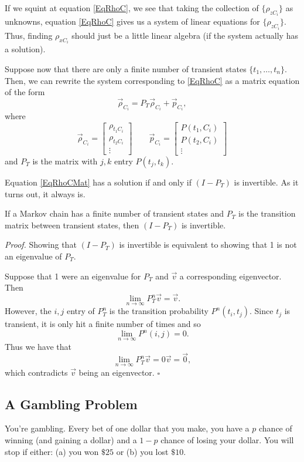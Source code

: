\documentclass{problemset}
\newcommand{\mat}[1]{\begin{bmatrix}#1\end{bmatrix}}
\renewcommand{\P}{\mathbb{P}}
\newenvironment{proof}{\emph{Proof.}}{\hfill$\square$}
\begin{document}
	If we squint at equation \eqref{EqRhoC}, we see that taking the collection of $\{\rho_{zC_i}\}$
	as unknowns, equation \eqref{EqRhoC} gives us a system of linear equations for $\{\rho_{zC_i}\}$.
	Thus, finding $\rho_{xC_i}$ should just be a little linear algebra (if the system actually has a solution).

	Suppose now that there are only a finite number of transient states $\{t_1,\ldots, t_n\}$.  Then, we can rewrite the
	system corresponding to \eqref{EqRhoC} as a matrix equation of the form
	\begin{equation}
		\label{EqRhoCMat}
		\vec \rho_{C_i} = P_T \vec \rho_{C_i} + \vec p_{C_i},
	\end{equation}
	where 
	\[
		\vec \rho_{C_i} = \mat{\rho_{t_1C_i}\\ \rho_{t_2C_i}\\\vdots}
		\qquad \vec p_{C_i} = \mat{P(t_1,C_i)\\P(t_2,C_i)\\\vdots}
	\]
	and $P_T$ is the matrix with $j,k$ entry $P(t_j,t_k)$.

	Equation \eqref{EqRhoCMat} has a solution if and only if $(I-P_T)$ is invertible.  As it turns
	out, it always is.

	\begin{theorem}
		If a Markov chain has a finite number of transient states and $P_T$ is the transition
		matrix between transient states, then $(I-P_T)$ is invertible.
	\end{theorem}
	\begin{proof}
		Showing that $(I-P_T)$ is invertible is equivalent to showing that 1 is not an
		eigenvalue of $P_T$.

		Suppose that 1 were an eigenvalue for $P_T$ and $\vec v$ a corresponding eigenvector.
		Then
		\[
			\lim_{n\to\infty} P_T^n\vec v = \vec v.
		\]
		However, the $i,j$ entry of $P_T^n$ is the transition probability $P^n(t_i,t_j)$.
		Since $t_j$ is transient, it is only hit a finite number of times and so
		\[
			\lim_{n\to\infty} P^n(i,j) = 0.
		\]
		Thus we have that 
		\[
			\lim_{n\to\infty} P_T^n\vec v = 0\vec v=\vec 0,
		\]
		which contradicts $\vec v$ being an eigenvector.
	\end{proof}


\subsection*{A Gambling Problem}

	You're gambling. Every bet of one dollar that you make, you have a $p$ chance of winning
	(and gaining a dollar) and a $1-p$ chance of losing your dollar.  You will stop if either: (a)
	you won $\$25$ or (b) you lost $\$10$.
\end{document}
